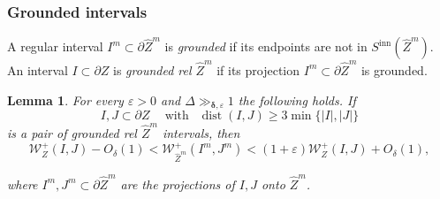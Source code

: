 \documentclass{amsart}
\renewcommand{\sp}{{\ \ }}
\newcommand{\1}{{\mathbb 1 }}
\newcommand{\Width}{{\mathcal W}}
\newcommand{\bDelta}{{\mathbb{\Delta}}}
\newcommand{\wZ}{{\widehat Z}}
\newcommand\inn{{\operatorname{inn}}}
\newtheorem{lem}[thm]{Lemma}
\theoremstyle{remark}
\numberwithin{equation}{section}
\theoremstyle{definition}
\newcommand{\dist}{\operatorname{dist}}
\newcommand{\bdelta}{{\boldsymbol{ \delta}}}
\begin{document}
\subsubsection{Grounded intervals}
\label{sss:ground inter}
  A regular interval $I^m\subset \partial \wZ^m$ is \emph{grounded} if its endpoints are not in $S^\inn (\wZ^m)$. An interval $I\subset \partial Z$ is \emph{grounded rel $\wZ^m$} if its projection $I^m\subset \partial \wZ^m$ is grounded.
  


\begin{lem}
\label{lem:W+:ground inter}
For every $\varepsilon>0$ and $\bDelta\gg_{\bdelta,\varepsilon} 1 $ the following holds.
If \[I, J\subset \partial Z\sp\sp\text{ with }\sp \dist(I,J)\ge 3 \min\{|I|,|J|\}\] is a pair of grounded rel $\wZ^m$ intervals,  then
\begin{equation}
\label{eq:lem:W+:ground inter} \Width^{+}_{Z} (I,J) - O_{\delta} (1)<  \Width^{+}_{\wZ^m} (I^m,J^m) <(1+\varepsilon) \Width^{+}_{Z} (I,J)+ O_{\delta} (1) ,
\end{equation}

where $I^m,J^m\subset \partial \wZ^m$ are the projections of $I,J$ onto $\wZ^m$.
\end{lem}
\end{document}
